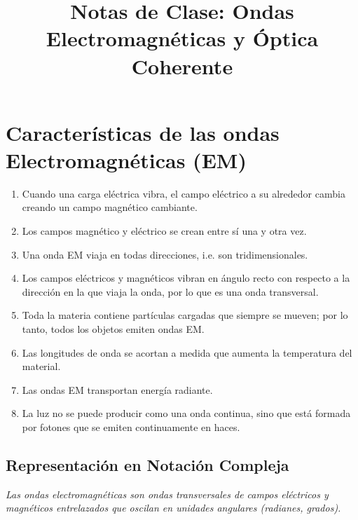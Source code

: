 \documentclass[12pt]{article}
\title{\textbf{Notas de Clase: Ondas Electromagnéticas y Óptica Coherente}}
\author{}
\date{}
\begin{document}
	
	\maketitle
	
	\section{Características de las ondas Electromagnéticas (EM)}
	\begin{enumerate}
		\item Cuando una carga eléctrica vibra, el campo eléctrico a su alrededor cambia creando un campo magnético cambiante.
		\item Los campos magnético y eléctrico se crean entre sí una y otra vez.
		\item Una onda EM viaja en todas direcciones, i.e. son tridimensionales.
		\item Los campos eléctricos y magnéticos vibran en ángulo recto con respecto a la dirección en la que viaja la onda, por lo que es una onda transversal.
		\item Toda la materia contiene partículas cargadas que siempre se mueven; por lo tanto, todos los objetos emiten ondas EM.
		\item Las longitudes de onda se acortan a medida que aumenta la temperatura del material.
		\item Las ondas EM transportan energía radiante.
		\item La luz no se puede producir como una onda continua, sino que está formada por fotones que se emiten continuamente en haces.
	\end{enumerate}
	
	\subsection{Representación en Notación Compleja}
	\textit{Las ondas electromagnéticas son ondas transversales de campos eléctricos y magnéticos entrelazados que oscilan en unidades angulares (radianes, grados).}
	
\end{document}
